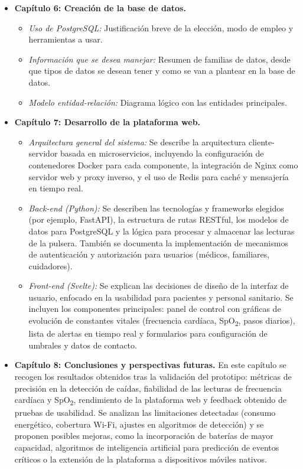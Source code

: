 \documentclass[12pt, a4paper]{article}
\begin{document}
\begin{itemize}
		\item \textbf{Capítulo 6: Creación de la base de datos.}
		\begin{itemize}
			\item \emph{Uso de PostgreSQL:} Justificación breve de la elección, modo de empleo y herramientas a usar.
			\item \emph{Información que se desea manejar:} Resumen de familias de datos, desde que tipos de datos se desean tener y como se van a plantear en la base de datos.
			\item \emph{Modelo entidad-relación:} Diagrama lógico con las entidades principales.
		\end{itemize}
		
		\item \textbf{Capítulo 7: Desarrollo de la plataforma web.}  
		\begin{itemize}
			\item \emph{Arquitectura general del sistema:} Se describe la arquitectura cliente-servidor basada en microservicios, incluyendo la configuración de contenedores Docker para cada componente, la integración de Nginx como servidor web y proxy inverso, y el uso de Redis para caché y mensajería en tiempo real.
			\item \emph{Back-end (Python):} Se describen las tecnologías y frameworks elegidos (por ejemplo, FastAPI), la estructura de rutas RESTful, los modelos de datos para PostgreSQL y la lógica para procesar y almacenar las lecturas de la pulsera. También se documenta la implementación de mecanismos de autenticación y autorización para usuarios (médicos, familiares, cuidadores).  
			\item \emph{Front-end (Svelte):} Se explican las decisiones de diseño de la interfaz de usuario, enfocado en la usabilidad para pacientes y personal sanitario. Se incluyen los componentes principales: panel de control con gráficas de evolución de constantes vitales (frecuencia cardíaca, SpO\textsubscript{2}, pasos diarios), lista de alertas en tiempo real y formularios para configuración de umbrales y datos de contacto.  
		\end{itemize}
		


		
		\item \textbf{Capítulo 8: Conclusiones y perspectivas futuras.}  
		En este capítulo se recogen los resultados obtenidos tras la validación del prototipo: métricas de precisión en la detección de caídas, fiabilidad de las lecturas de frecuencia cardíaca y SpO\textsubscript{2}, rendimiento de la plataforma web y feedback obtenido de pruebas de usabilidad. Se analizan las limitaciones detectadas (consumo energético, cobertura Wi-Fi, ajustes en algoritmos de detección) y se proponen posibles mejoras, como la incorporación de baterías de mayor capacidad, algoritmos de inteligencia artificial para predicción de eventos críticos o la extensión de la plataforma a dispositivos móviles nativos.
		

\end{itemize}
\end{document}
